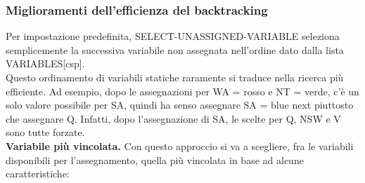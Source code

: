 \subsubsection{Miglioramenti dell'efficienza del backtracking}
Per impostazione predefinita, SELECT-UNASSIGNED-VARIABLE seleziona semplicemente
la successiva variabile non assegnata nell'ordine dato dalla lista
VARIABLES[csp]. \\Questo ordinamento di variabili statiche raramente si traduce
nella ricerca più efficiente. Ad esempio, dopo le assegnazioni per WA = rosso e
NT = verde, c'è un solo valore possibile per SA, quindi ha senso assegnare SA =
blue next piuttosto che assegnare Q. Infatti, dopo l'assegnazione di SA, le
scelte per Q, NSW e V sono tutte forzate.\\

\textbf{Variabile più vincolata.} Con questo approccio si va a scegliere, fra le
variabili disponibili per l'assegnamento, quella più vincolata in base ad alcune
caratteristiche:
